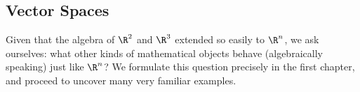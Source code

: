 % 
%
%

\begin{partbacktext}
\part{Vector Spaces}
\noindent 
Given that the algebra of $\R^2$ and $\R^3$  extended so easily to $\R^n$, we ask ourselves:  what other kinds of mathematical objects behave (algebraically speaking) just like $\R^n$?   We formulate this question precisely in the first
chapter, and proceed to uncover many very familiar examples.

\end{partbacktext}
